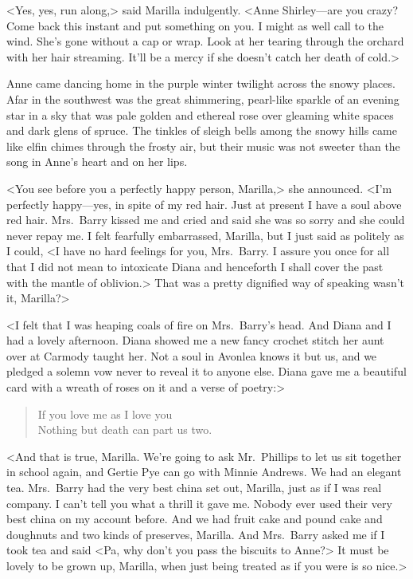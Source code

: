 <Yes, yes, run along,> said Marilla indulgently. <Anne Shirley—are you crazy? Come back this instant and put something on you. I might as well call to the wind. She's gone without a cap or wrap. Look at her tearing through the orchard with her hair streaming. It'll be a mercy if she doesn't catch her death of cold.>

Anne came dancing home in the purple winter twilight across the snowy places. Afar in the southwest was the great shimmering, pearl-like sparkle of an evening star in a sky that was pale golden and ethereal rose over gleaming white spaces and dark glens of spruce. The tinkles of sleigh bells among the snowy hills came like elfin chimes through the frosty air, but their music was not sweeter than the song in Anne's heart and on her lips.

<You see before you a perfectly happy person, Marilla,> she announced. <I'm perfectly happy—yes, in spite of my red hair. Just at present I have a soul above red hair. Mrs.~Barry kissed me and cried and said she was so sorry and she could never repay me. I felt fearfully embarrassed, Marilla, but I just said as politely as I could, <I have no hard feelings for you, Mrs.~Barry. I assure you once for all that I did not mean to intoxicate Diana and henceforth I shall cover the past with the mantle of oblivion.> That was a pretty dignified way of speaking wasn't it, Marilla?>

<I felt that I was heaping coals of fire on Mrs.~Barry's head. And Diana and I had a lovely afternoon. Diana showed me a new fancy crochet stitch her aunt over at Carmody taught her. Not a soul in Avonlea knows it but us, and we pledged a solemn vow never to reveal it to anyone else. Diana gave me a beautiful card with a wreath of roses on it and a verse of poetry:>

\begin{verse}
If you love me as I love you\\
Nothing but death can part us two.
\end{verse}

<And that is true, Marilla. We're going to ask Mr.~Phillips to let us sit together in school again, and Gertie Pye can go with Minnie Andrews. We had an elegant tea. Mrs.~Barry had the very best china set out, Marilla, just as if I was real company. I can't tell you what a thrill it gave me. Nobody ever used their very best china on my account before. And we had fruit cake and pound cake and doughnuts and two kinds of preserves, Marilla. And Mrs.~Barry asked me if I took tea and said <Pa, why don't you pass the biscuits to Anne?> It must be lovely to be grown up, Marilla, when just being treated as if you were is so nice.>


